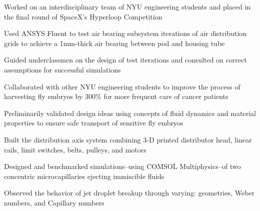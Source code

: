 \documentclass[]{deedy-resume-openfont}
\begin{document}
\begin{minipage}[t]{0.66\textwidth}
\begin{tightemize}
\item Worked on an interdisciplinary team of NYU engineering students and placed in the final round of SpaceX's Hyperloop Competition
\item Used ANSYS Fluent to test air bearing subsystem iterations of air distribution grids to achieve a 1mm-thick air bearing between pod and housing tube
\item Guided underclassmen on the design of test iterations and consulted on correct assumptions for successful simulations
\end{tightemize}
\sectionsep

\begin{tightemize}
\item Collaborated with other NYU engineering students to improve the process of harvesting fly embryos by 300{\% }for more frequent care of cancer patients
\item Preliminarily validated design ideas using concepts of fluid dynamics and material properties to ensure safe transport of sensitive fly embryos
\item Built the distribution axis system combining 3-D printed distributor head, linear rails, limit switches, belts, pulleys, and motors
\end{tightemize}
\sectionsep

\begin{tightemize}
\item Designed and benchmarked simulations--using COMSOL Multiphysics--of two concentric microcapillaries ejecting immiscible fluids
\item Observed the behavior of jet droplet breakup through varying: geometries, Weber numbers, and Capillary numbers
\end{tightemize}
\sectionsep


\end{minipage} 
\end{document}
